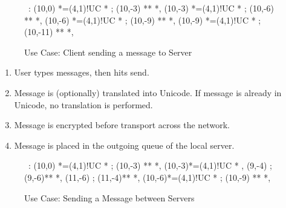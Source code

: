 

\begin{figure}[h]

\small

\begin{center}

\ \xy<1cm,0cm>:
(10,0) 	*=(4,1)!UC *\frm{-} ;
(10,-3) **\dir{-} *\dir{>},
(10,-3)	*=(4,1)!UC *\frm{--} ; 
(10,-6) **\dir{-} *\dir{>},
(10,-6)	*=(4,1)!UC *\frm{--} ; 
(10,-9) **\dir{-} *\dir{>},
(10,-9)	*=(4,1)!UC *\frm{-} ; 
(10,-11) **\dir{=} *\dir{>},
\endxy

\end{center}

\caption{Use Case: Client sending a message to Server}

\end{figure}


\begin{enumerate}

\item User types messages, then hits send.

\item Message is (optionally) translated into Unicode. If message is
already in Unicode, no translation is performed.

\item Message is encrypted before transport across the network.

\item Message is placed in the outgoing queue of the local server.

\end{enumerate}


\begin{figure}[h]

\small

\begin{center}

\ \xy<1cm,0cm>:
(10,0) *=(4,1)!UC *\frm{-} ;
(10,-3) **\dir{-} *\dir{>},
(10,-3)*=(4,1)!UC *\frm{-} , 
(9,-4) ; (9,-6)**\dir{-} *\dir{>},
(11,-6) ; (11,-4)**\dir{--} *\dir{>},
(10,-6)*=(4,1)!UC *\frm{-} ; 
(10,-9) **\dir{=} *\dir{>},
\endxy

\end{center}

\caption{Use Case: Sending a Message between Servers}

\end{figure}


